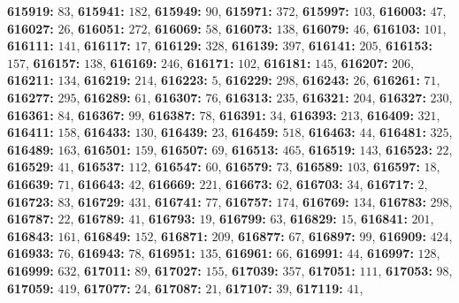 \textsf{\bfseries 615919:} $83$, \textsf{\bfseries 615941:} $182$, \textsf{\bfseries 615949:} $90$, \textsf{\bfseries 615971:} $372$, \textsf{\bfseries 615997:} $103$, \textsf{\bfseries 616003:} $47$, \textsf{\bfseries 616027:} $26$, \textsf{\bfseries 616051:} $272$, \textsf{\bfseries 616069:} $58$, \textsf{\bfseries 616073:} $138$, \textsf{\bfseries 616079:} $46$, \textsf{\bfseries 616103:} $101$, \textsf{\bfseries 616111:} $141$, \textsf{\bfseries 616117:} $17$, \textsf{\bfseries 616129:} $328$, \textsf{\bfseries 616139:} $397$, \textsf{\bfseries 616141:} $205$, \textsf{\bfseries 616153:} $157$, \textsf{\bfseries 616157:} $138$, \textsf{\bfseries 616169:} $246$, \textsf{\bfseries 616171:} $102$, \textsf{\bfseries 616181:} $145$, \textsf{\bfseries 616207:} $206$, \textsf{\bfseries 616211:} $134$, \textsf{\bfseries 616219:} $214$, \textsf{\bfseries 616223:} $5$, \textsf{\bfseries 616229:} $298$, \textsf{\bfseries 616243:} $26$, \textsf{\bfseries 616261:} $71$, \textsf{\bfseries 616277:} $295$, \textsf{\bfseries 616289:} $61$, \textsf{\bfseries 616307:} $76$, \textsf{\bfseries 616313:} $235$, \textsf{\bfseries 616321:} $204$, \textsf{\bfseries 616327:} $230$, \textsf{\bfseries 616361:} $84$, \textsf{\bfseries 616367:} $99$, \textsf{\bfseries 616387:} $78$, \textsf{\bfseries 616391:} $34$, \textsf{\bfseries 616393:} $213$, \textsf{\bfseries 616409:} $321$, \textsf{\bfseries 616411:} $158$, \textsf{\bfseries 616433:} $130$, \textsf{\bfseries 616439:} $23$, \textsf{\bfseries 616459:} $518$, \textsf{\bfseries 616463:} $44$, \textsf{\bfseries 616481:} $325$, \textsf{\bfseries 616489:} $163$, \textsf{\bfseries 616501:} $159$, \textsf{\bfseries 616507:} $69$, \textsf{\bfseries 616513:} $465$, \textsf{\bfseries 616519:} $143$, \textsf{\bfseries 616523:} $22$, \textsf{\bfseries 616529:} $41$, \textsf{\bfseries 616537:} $112$, \textsf{\bfseries 616547:} $60$, \textsf{\bfseries 616579:} $73$, \textsf{\bfseries 616589:} $103$, \textsf{\bfseries 616597:} $18$, \textsf{\bfseries 616639:} $71$, \textsf{\bfseries 616643:} $42$, \textsf{\bfseries 616669:} $221$, \textsf{\bfseries 616673:} $62$, \textsf{\bfseries 616703:} $34$, \textsf{\bfseries 616717:} $2$, \textsf{\bfseries 616723:} $83$, \textsf{\bfseries 616729:} $431$, \textsf{\bfseries 616741:} $77$, \textsf{\bfseries 616757:} $174$, \textsf{\bfseries 616769:} $134$, \textsf{\bfseries 616783:} $298$, \textsf{\bfseries 616787:} $22$, \textsf{\bfseries 616789:} $41$, \textsf{\bfseries 616793:} $19$, \textsf{\bfseries 616799:} $63$, \textsf{\bfseries 616829:} $15$, \textsf{\bfseries 616841:} $201$, \textsf{\bfseries 616843:} $161$, \textsf{\bfseries 616849:} $152$, \textsf{\bfseries 616871:} $209$, \textsf{\bfseries 616877:} $67$, \textsf{\bfseries 616897:} $99$, \textsf{\bfseries 616909:} $424$, \textsf{\bfseries 616933:} $76$, \textsf{\bfseries 616943:} $78$, \textsf{\bfseries 616951:} $135$, \textsf{\bfseries 616961:} $66$, \textsf{\bfseries 616991:} $44$, \textsf{\bfseries 616997:} $128$, \textsf{\bfseries 616999:} $632$, \textsf{\bfseries 617011:} $89$, \textsf{\bfseries 617027:} $155$, \textsf{\bfseries 617039:} $357$, \textsf{\bfseries 617051:} $111$, \textsf{\bfseries 617053:} $98$, \textsf{\bfseries 617059:} $419$, \textsf{\bfseries 617077:} $24$, \textsf{\bfseries 617087:} $21$, \textsf{\bfseries 617107:} $39$, \textsf{\bfseries 617119:} $41$, 
